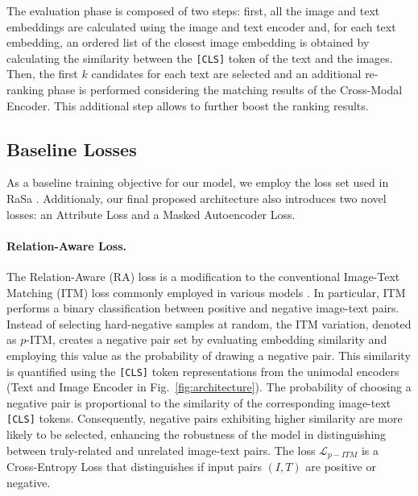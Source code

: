 \documentclass[acmsmall]{acmart}
\begin{document}
The evaluation phase is composed of two steps: first, all the image and text embeddings are calculated using the image and text encoder and, for each text embedding, an ordered list of the closest image embedding is obtained by calculating the similarity between the \texttt{[CLS]} token of the text and the images. Then, the first $k$ candidates for each text are selected and an additional re-ranking phase is performed considering the matching results of the Cross-Modal Encoder. This additional step allows to further boost the ranking results.

\subsection{Baseline Losses}\label{sec:losses}
As a baseline training objective for our model, we employ the loss set used in RaSa \cite{bai2023rasa}. Additionaly, our final proposed architecture also introduces two novel losses: an Attribute Loss and a Masked Autoencoder Loss. 

\paragraph{Relation-Aware Loss.}
The Relation-Aware (RA) loss is a modification to the conventional Image-Text Matching (ITM) loss commonly employed in various models \cite{li2021align,li2022blip,yang2023towards}. In particular, ITM performs a binary classification between positive and negative image-text pairs. Instead of selecting hard-negative samples at random, the ITM variation, denoted as $p$-ITM, creates a negative pair set by evaluating embedding similarity and employing this value as the probability of drawing a negative pair. This similarity is quantified using the \texttt{[CLS]} token representations from the unimodal encoders (Text and Image Encoder in Fig.~\ref{fig:architecture}). The probability of choosing a negative pair is proportional to the similarity of the corresponding image-text \texttt{[CLS]} tokens. Consequently, negative pairs exhibiting higher similarity are more likely to be selected, enhancing the robustness of the model in distinguishing between truly-related and unrelated image-text pairs. The loss $\mathcal{L}_{p-ITM}$ is a Cross-Entropy Loss that distinguishes if input pairs $(I, T)$ are positive or negative.
\end{document}
